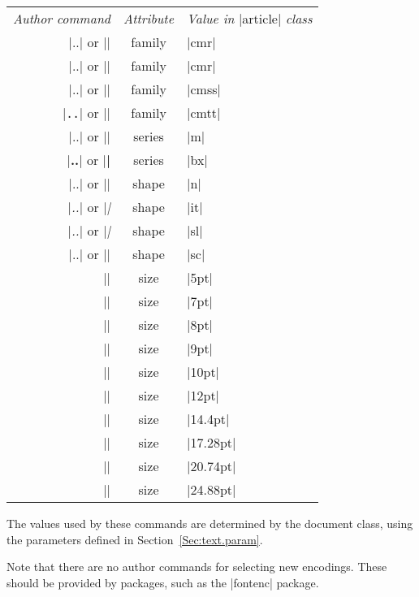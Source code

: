 \documentclass{ltxguide}[1995/11/28]
\begin{document}
\begin{center}
  \begin{tabular}{rcl}
    \emph{Author command} & \emph{Attribute}
                          & \emph{Value in} |article| \emph{class} \\
    |\textnormal{..}| or |\normalfont| & family & |cmr|     \\
    |\textrm{..}| or |\rmfamily|       & family & |cmr|     \\
    |\textsf{..}| or |\sffamily|       & family & |cmss|    \\
    |\texttt{..}| or |\ttfamily|       & family & |cmtt|    \\
    |\textmd{..}| or |\mdseries|       & series & |m|       \\
    |\textbf{..}| or |\bfseries|       & series & |bx|      \\
    |\textup{..}| or |\upshape|        & shape  & |n|       \\
    |\textit{..}| or |\itshape|        & shape  & |it|      \\
    |\textsl{..}| or |\slshape|        & shape  & |sl|      \\
    |\textsc{..}| or |\scshape|        & shape  & |sc|      \\
    |\tiny|                            & size   & |5pt|     \\
    |\scriptsize|                      & size   & |7pt|     \\
    |\footnotesize|                    & size   & |8pt|     \\
    |\small|                           & size   & |9pt|     \\
    |\normalsize|                      & size   & |10pt|    \\
    |\large|                           & size   & |12pt|    \\
    |\Large|                           & size   & |14.4pt|  \\
    |\LARGE|                           & size   & |17.28pt| \\
    |\huge|                            & size   & |20.74pt| \\
    |\Huge|                            & size   & |24.88pt|
  \end{tabular}
\end{center}
The values used by these commands are determined by the document class,
using the parameters defined in Section~\ref{Sec:text.param}.

Note that there are no author commands for selecting new encodings.
These should be provided by packages, such as the |fontenc| package.
\end{document}
